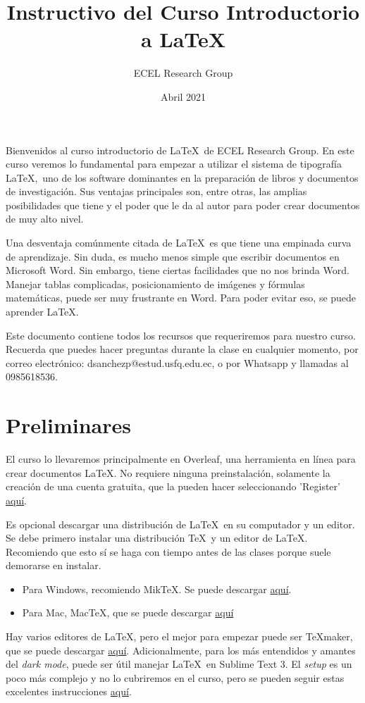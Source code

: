 \documentclass[a4paper]{article}
\title{Instructivo del Curso Introductorio a \LaTeX}
\author{ECEL Research Group}
\date{Abril 2021}
\begin{document}
\maketitle
Bienvenidos al curso introductorio de \LaTeX \ de ECEL Research Group. En este curso veremos lo fundamental para empezar a utilizar el sistema de tipografía \LaTeX,\ uno de los software dominantes en la preparación de libros y documentos de investigación. Sus ventajas principales son, entre otras, las amplias posibilidades que tiene y el poder que le da al autor para poder crear documentos de muy alto nivel. 

Una desventaja comúnmente citada de  \LaTeX \ es que tiene una empinada curva de aprendizaje. Sin duda, es mucho menos simple que escribir documentos en Microsoft Word. Sin embargo, tiene ciertas facilidades que no nos brinda Word. Manejar tablas complicadas, posicionamiento de imágenes y fórmulas matemáticas, puede ser muy frustrante en Word. Para poder evitar eso, se puede aprender \LaTeX. 


Este documento contiene todos los recursos que requeriremos para nuestro curso. Recuerda que puedes hacer preguntas durante la clase en cualquier momento, por correo electrónico: dsanchezp@estud.usfq.edu.ec, o por Whatsapp y llamadas al 0985618536. 

\section{Preliminares}
El curso lo llevaremos principalmente en Overleaf, una herramienta en línea para crear documentos \LaTeX. No requiere ninguna preinstalación, solamente la creación de una cuenta gratuita, que la pueden hacer seleccionando 'Register' \href{https://www.overleaf.com/}{aquí}.

Es opcional descargar una distribución de \LaTeX \ en su computador y un editor. Se debe primero instalar una distribución \TeX \ y un editor de \LaTeX. Recomiendo que esto sí se haga con tiempo antes de las clases porque suele demorarse en instalar.
\begin{itemize}
    \item Para Windows, recomiendo Mik\TeX. Se puede descargar \href{https://miktex.org/download}{aquí}.
    \item Para Mac, Mac\TeX, que se puede descargar \href{https://tug.org/mactex/mactex-download.html}{aquí}
\end{itemize}
Hay varios editores de \LaTeX, pero el mejor para empezar puede ser \TeX maker, que se puede descargar \href{https://www.xm1math.net/texmaker/index.html}{aquí}.
Adicionalmente, para los más entendidos y amantes del \textit{dark mode}, puede ser útil manejar \LaTeX \ en Sublime Text 3. El \textit{setup} es un poco más complejo y no lo cubriremos en el curso, pero se pueden seguir estas excelentes instrucciones \href{https://jdhao.github.io/2018/03/10/sublime-text-latextools-setup/}{aquí}.
\end{document}
